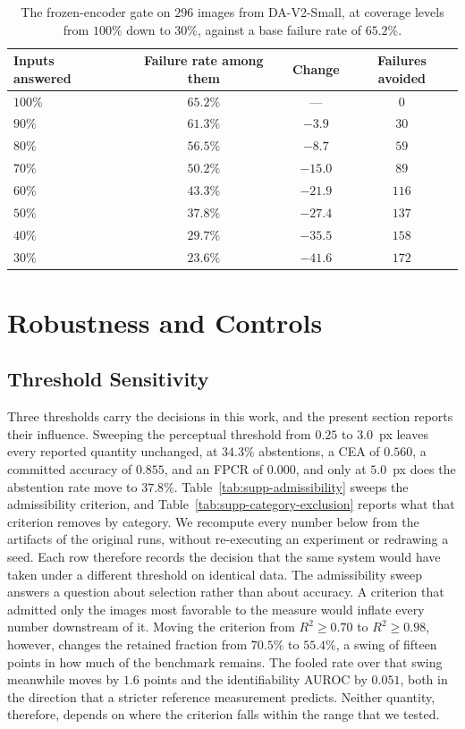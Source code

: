 \documentclass{article} %
\theoremstyle{defstyle}
\theoremstyle{plain}
\begin{document}
\begin{table}[htb]
\caption{The frozen-encoder gate on $296$ images from DA-V2-Small, at coverage levels from $100\%$ down to $30\%$, against a base failure rate of $65.2\%$.}
\label{tab:supp-operating}
\begin{center}
\footnotesize
\begin{tabular}{lccc}
\toprule
\textbf{Inputs answered} & \textbf{Failure rate among them} &
\textbf{Change} & \textbf{Failures avoided} \\
\midrule
$100\%$ & $65.2\%$ & --- & $0$ \\
$90\%$  & $61.3\%$ & $-3.9$  & $30$ \\
$80\%$  & $56.5\%$ & $-8.7$  & $59$ \\
$70\%$  & $50.2\%$ & $-15.0$ & $89$ \\
$60\%$  & $43.3\%$ & $-21.9$ & $116$ \\
$50\%$  & $37.8\%$ & $-27.4$ & $137$ \\
$40\%$  & $29.7\%$ & $-35.5$ & $158$ \\
$30\%$  & $23.6\%$ & $-41.6$ & $172$ \\
\bottomrule
\end{tabular}
\end{center}
\end{table}

\section{Robustness and Controls}

\subsection{Threshold Sensitivity}
\label{sec:supp-sensitivity}

Three thresholds carry the decisions in this work, and the present section reports their
influence. Sweeping the perceptual threshold from $0.25$ to $3.0$~px leaves every reported
quantity unchanged, at $34.3\%$ abstentions, a CEA of $0.560$, a committed accuracy of $0.855$,
and an FPCR of $0.000$, and only at $5.0$~px does the abstention rate move to $37.8\%$.
Table~\ref{tab:supp-admissibility} sweeps the admissibility criterion, and
Table~\ref{tab:supp-category-exclusion} reports what that criterion removes by category. We
recompute every number below from the artifacts of the original runs, without re-executing an
experiment or redrawing a seed. Each row therefore records the decision that the same system
would have taken under a different threshold on identical data. The admissibility sweep answers
a question about selection rather than about accuracy. A criterion that admitted only the
images most favorable to the measure would inflate every number downstream of it. Moving the
criterion from $R^2 \geq 0.70$ to $R^2 \geq 0.98$, however, changes the retained fraction from
$70.5\%$ to $55.4\%$, a swing of fifteen points in how much of the benchmark remains. The
fooled rate over that swing meanwhile moves by $1.6$ points and the identifiability AUROC by
$0.051$, both in the direction that a stricter reference measurement predicts. Neither
quantity, therefore, depends on where the criterion falls within the range that we tested.
\end{document}
